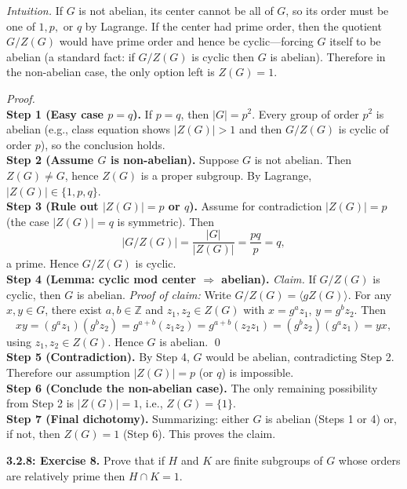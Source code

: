 \documentclass[12pt]{article}
\theoremstyle{definition}
\begin{document}
\newpage

\dotfill

\emph{Intuition.} If $G$ is not abelian, its center cannot be all of $G$, so its order must be one of $1,p,$ or $q$ by Lagrange. If the center had prime order, then the quotient $G/Z(G)$ would have prime order and hence be cyclic—forcing $G$ itself to be abelian (a standard fact: if $G/Z(G)$ is cyclic then $G$ is abelian). Therefore in the non-abelian case, the only option left is $Z(G)=1$.\\

\dotfill

\emph{Proof.}\\
\textbf{Step 1 (Easy case $p=q$).} If $p=q$, then $|G|=p^2$. Every group of order $p^2$ is abelian (e.g., class equation shows $|Z(G)|>1$ and then $G/Z(G)$ is cyclic of order $p$), so the conclusion holds.\\
\textbf{Step 2 (Assume $G$ is non-abelian).} Suppose $G$ is not abelian. Then $Z(G)\neq G$, hence $Z(G)$ is a proper subgroup. By Lagrange, $|Z(G)|\in\{1,p,q\}$.\\
\textbf{Step 3 (Rule out $|Z(G)|=p$ or $q$).} Assume for contradiction $|Z(G)|=p$ (the case $|Z(G)|=q$ is symmetric). Then
\[
|G/Z(G)|=\frac{|G|}{|Z(G)|}=\frac{pq}{p}=q,
\]
a prime. Hence $G/Z(G)$ is cyclic.\\
\textbf{Step 4 (Lemma: cyclic mod center $\Rightarrow$ abelian).} \emph{Claim.} If $G/Z(G)$ is cyclic, then $G$ is abelian. \emph{Proof of claim:} Write $G/Z(G)=\langle gZ(G)\rangle$. For any $x,y\in G$, there exist $a,b\in\mathbb{Z}$ and $z_1,z_2\in Z(G)$ with $x=g^a z_1$, $y=g^b z_2$. Then
\[
xy=(g^a z_1)(g^b z_2)=g^{a+b}(z_1 z_2)=g^{a+b}(z_2 z_1)=(g^b z_2)(g^a z_1)=yx,
\]
using $z_1,z_2\in Z(G)$. Hence $G$ is abelian. \qed\\
\textbf{Step 5 (Contradiction).} By Step 4, $G$ would be abelian, contradicting Step 2. Therefore our assumption $|Z(G)|=p$ (or $q$) is impossible.\\
\textbf{Step 6 (Conclude the non-abelian case).} The only remaining possibility from Step 2 is $|Z(G)|=1$, i.e., $Z(G)=\{1\}$.\\
\textbf{Step 7 (Final dichotomy).} Summarizing: either $G$ is abelian (Steps 1 or 4) or, if not, then $Z(G)=1$ (Step 6). This proves the claim.\\

\newpage

\newpage

\noindent \textbf{3.2.8: Exercise 8.} Prove that if $H$ and $K$ are finite subgroups of $G$ whose orders are relatively prime then $H\cap K=1$.\\ %
\end{document}

